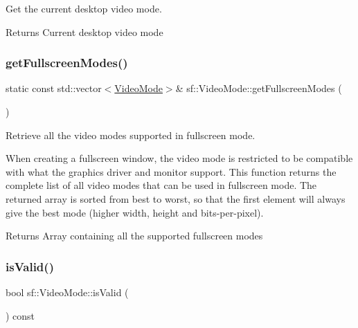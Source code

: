 Get the current desktop video mode. 

\begin{DoxyReturn}{Returns}
Current desktop video mode 
\end{DoxyReturn}
\mbox{\label{classsf_1_1_video_mode_a6815b9b3b35767d5b4563fbed4bfc67b}} 
\subsubsection{\texorpdfstring{get\+Fullscreen\+Modes()}{getFullscreenModes()}}
{\footnotesize\ttfamily static const std\+::vector$<$\hyperlink{classsf_1_1_video_mode}{Video\+Mode}$>$\& sf\+::\+Video\+Mode\+::get\+Fullscreen\+Modes (\begin{DoxyParamCaption}{ }\end{DoxyParamCaption})\hspace{0.3cm}{\ttfamily [static]}}



Retrieve all the video modes supported in fullscreen mode. 

When creating a fullscreen window, the video mode is restricted to be compatible with what the graphics driver and monitor support. This function returns the complete list of all video modes that can be used in fullscreen mode. The returned array is sorted from best to worst, so that the first element will always give the best mode (higher width, height and bits-\/per-\/pixel).

\begin{DoxyReturn}{Returns}
Array containing all the supported fullscreen modes 
\end{DoxyReturn}
\mbox{\label{classsf_1_1_video_mode_ad5e04c044b0925523c75ecb173d2129a}} 
\subsubsection{\texorpdfstring{is\+Valid()}{isValid()}}
{\footnotesize\ttfamily bool sf\+::\+Video\+Mode\+::is\+Valid (\begin{DoxyParamCaption}{ }\end{DoxyParamCaption}) const}




